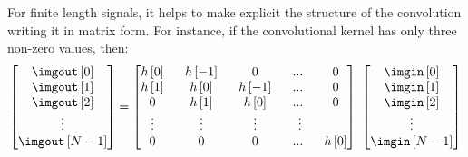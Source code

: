 For finite length signals, it helps to make explicit the structure of the convolution writing it in matrix form. For instance, if the convolutional kernel has only three non-zero values, then:
\begin{equation}
	\begin{bmatrix}
		\imgout \left[ 0 \right] \\
		\imgout \left[ 1 \right] \\
		\imgout \left[ 2 \right] \\
		\vdots                   \\
		\imgout \left[ N-1 \right]
	\end{bmatrix}
	=
	\begin{bmatrix}
		h\left[0\right] ~ & ~ h\left[-1\right] ~ & ~ 0 ~                & ~ ... ~   & ~ 0               \\
		h\left[1\right] ~ & ~ h\left[0\right] ~  & ~ h\left[-1\right] ~ & ~... ~    & ~ 0               \\
		0 ~               & ~ h\left[1\right] ~  & ~ h\left[0\right] ~  & ~... ~    & ~ 0               \\
		\vdots ~          & ~  \vdots ~          & ~  \vdots ~          & ~  \vdots                     \\
		0 ~               & ~ 0 ~                & ~ 0 ~                & ~... ~    & ~ h\left[0\right]
	\end{bmatrix}
	~
	\begin{bmatrix}
		\imgin \left[0\right] \\
		\imgin \left[1\right] \\
		\imgin \left[2\right] \\
		\vdots                \\
		\imgin \left[N-1\right]
	\end{bmatrix}
\end{equation}

